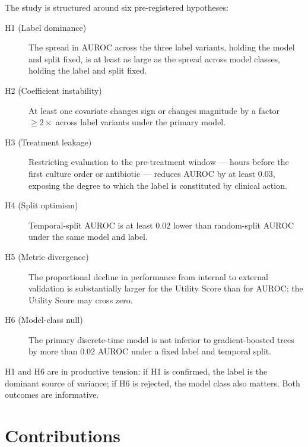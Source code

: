 The study is structured around six pre-registered hypotheses:

\begin{description}
  \item[H1 (Label dominance)] The spread in AUROC across the three label variants,
  holding the model and split fixed, is at least as large as the spread across
  model classes, holding the label and split fixed.
  \item[H2 (Coefficient instability)] At least one covariate changes sign or
  changes magnitude by a factor $\geq 2\times$ across label variants under the
  primary model.
  \item[H3 (Treatment leakage)] Restricting evaluation to the pre-treatment
  window --- hours before the first culture order or antibiotic --- reduces AUROC
  by at least 0.03, exposing the degree to which the label is constituted by
  clinical action.
  \item[H4 (Split optimism)] Temporal-split AUROC is at least 0.02 lower than
  random-split AUROC under the same model and label.
  \item[H5 (Metric divergence)] The proportional decline in performance from
  internal to external validation is substantially larger for the Utility Score
  than for AUROC; the Utility Score may cross zero.
  \item[H6 (Model-class null)] The primary discrete-time model is not inferior
  to gradient-boosted trees by more than 0.02 AUROC under a fixed label and
  temporal split.
\end{description}

H1 and H6 are in productive tension: if H1 is confirmed, the label is the
dominant source of variance; if H6 is rejected, the model class also matters.
Both outcomes are informative.

\section{Contributions}
\label{sec:contrib}

